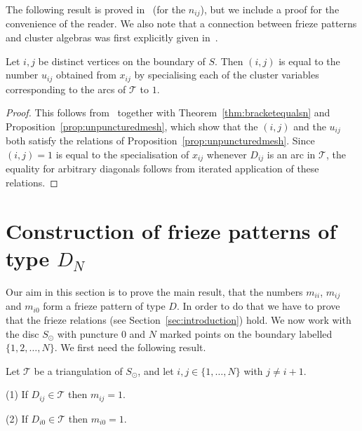 \documentclass[a4paper]{amsart}
\begin{document}
The following result is proved in~\cite[\S 3]{propp} (for the $n_{ij}$),
but we include a proof for the convenience of the reader.
We also note that a connection between frieze patterns and cluster
algebras was first explicitly given in~\cite{calderochapoton06}. 

\begin{theorem} \label{thm:clustertypeA}
Let $i,j$ be distinct vertices on the boundary of $S$. Then $(i,j)$ is
equal to the number $u_{ij}$ obtained from $x_{ij}$ by specialising each
of the cluster variables corresponding to the arcs of ${\mathcal T}$ to $1$.
\end{theorem}

\begin{proof}
This follows from~\cite{fominzelevinsky03} together with
Theorem~\ref{thm:bracketequalsn} and Proposition~\ref{prop:unpuncturedmesh},
which show that the $(i,j)$ and the $u_{ij}$ both satisfy the
relations of Proposition~\ref{prop:unpuncturedmesh}.
Since $(i,j)=1$ is equal to the specialisation of $x_{ij}$ whenever $D_{ij}$
is an arc in ${\mathcal T}$, the equality for arbitrary diagonals follows from
iterated application of these relations.
\end{proof}

\section{Construction of frieze patterns of type $D_N$}
\label{sec:mesh-rel}

Our aim in this section is to prove the main result, that the numbers
$m_{ii}$, $m_{ij}$ and $m_{i0}$ form a frieze
pattern of type $D$. In order to do that we have to prove that the
frieze relations (see Section~\ref{sec:introduction}) hold. We now work
with the disc $S_{\odot}$ with puncture $0$ and $N$ marked points on the
boundary labelled $\{1,2,\ldots ,N\}$.
We first need the following result.

\begin{lemma} \label{lem:onecase}
Let ${\mathcal T}$ be a triangulation of $S_{\odot}$, and let
$i, j\in\{1,\dots,N\}$ with $j\neq i+1$.

(1) If $D_{ij}\in{\mathcal T}$ then $m_{ij}=1$.

(2) If $D_{i0}\in{\mathcal T}$ then $m_{i0}=1$.
\end{lemma}
\end{document}
